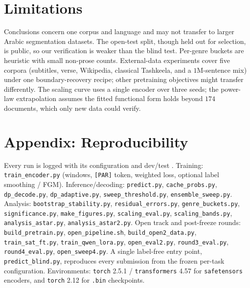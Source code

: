 \section*{Limitations}
Conclusions concern one corpus and language and may not transfer to larger Arabic
segmentation datasets. The open-test split, though held out for selection, is public,
so our verification is weaker than the blind test. Per-genre buckets are heuristic
with small non-prose counts. External-data experiments cover five corpora (subtitles, verse, Wikipedia,
classical Tashkeela, and a $1$M-sentence mix) under one boundary-recovery recipe;
other pretraining objectives might transfer differently. The scaling
curve uses a single encoder over three seeds; the power-law extrapolation assumes the
fitted functional form holds beyond $174$ documents, which only new data could verify.

\section*{Appendix: Reproducibility}
Every run is logged with its configuration and dev/test \fone{}. Training:
\texttt{train\_encoder.py} (windows, \texttt{[PAR]} token, weighted loss, optional
label smoothing / FGM). Inference/decoding: \texttt{predict.py},
\texttt{cache\_probs.py}, \texttt{dp\_decode.py}, \texttt{dp\_adaptive.py},
\texttt{sweep\_threshold.py}, \texttt{ensemble\_sweep.py}. Analysis:
\texttt{bootstrap\_stability.py}, \texttt{residual\_errors.py},
\texttt{genre\_buckets.py}, \texttt{significance.py}, \texttt{make\_figures.py},
\texttt{scaling\_eval.py}, \texttt{scaling\_bands.py},
\texttt{analysis\_astar.py}, \texttt{analysis\_astar2.py}. Open track and
post-freeze rounds: \texttt{build\_pretrain.py}, \texttt{open\_pipeline.sh},
\texttt{build\_open2\_data.py}, \texttt{train\_sat\_ft.py},
\texttt{train\_qwen\_lora.py}, \texttt{open\_eval2.py}, \texttt{round3\_eval.py},
\texttt{round4\_eval.py}, \texttt{open\_sweep4.py}. A single label-free entry point,
\texttt{predict\_blind.py}, reproduces every submission from the frozen per-task
configuration. Environments: \texttt{torch} 2.5.1 / \texttt{transformers} 4.57 for
\texttt{safetensors} encoders, and \texttt{torch} 2.12 for \texttt{.bin} checkpoints.

